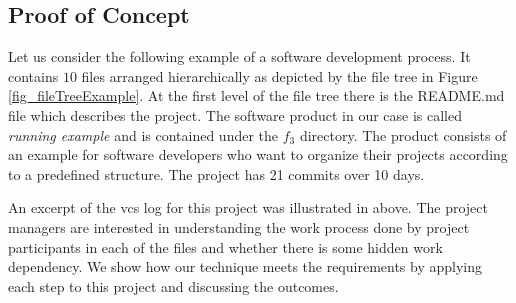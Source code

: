 \subsection{Proof of Concept}
\label{subsec:scenario}

Let us consider the following example of a software development process. It contains $10$ files arranged hierarchically as depicted by the file tree in Figure \ref{fig_fileTreeExample}. At the first level of the file tree there is the README.md file which describes the project. The software product in our case is called \emph{running example} and is contained under the $f_3$ directory. The product consists of an example for software developers who want to organize their projects according to a predefined structure. The project has 21 commits over 10 days.



An excerpt of the \gls{vcs} log for this project was illustrated in  above. The project managers are interested in understanding the work process done by project participants in each of the files and whether there is some hidden work dependency. We show how our technique meets the requirements by applying each step to this project and discussing the outcomes.

